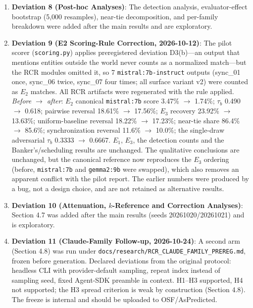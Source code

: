 \documentclass[11pt]{article}
\begin{document}
\begin{enumerate}
\item \textbf{Deviation 8 (Post-hoc Analyses)}: The detection analysis, evaluator-effect bootstrap (5,000 resamples), near-tie decomposition, and per-family breakdown were added after the main results and are exploratory.
\item \textbf{Deviation 9 (E2 Scoring-Rule Correction, 2026-10-12)}: The pilot scorer (\texttt{scoring.py}) applies preregistered deviation D3(b)---an output that mentions entities outside the world never counts as a normalized match---but the RCR modules omitted it, so 7 \texttt{mistral:7b-instruct} outputs (sync\_01 once, sync\_06 twice, sync\_07 four times; all surface variant v2) were counted as $E_2$ matches. All RCR artifacts were regenerated with the rule applied. \emph{Before $\rightarrow$ after}: $E_2$ canonical \texttt{mistral:7b} score 3.47\% $\rightarrow$ 1.74\%; $\tau_b$ 0.490 $\rightarrow$ 0.618; pairwise reversal 18.61\% $\rightarrow$ 17.56\%; $E_3$ recovery 23.92\% $\rightarrow$ 13.63\%; uniform-baseline reversal 18.22\% $\rightarrow$ 17.23\%; near-tie share 86.4\% $\rightarrow$ 85.6\%; synchronization reversal 11.6\% $\rightarrow$ 10.0\%; the single-draw adversarial $\tau_b$ 0.3333 $\rightarrow$ 0.6667. $E_1$, $E_3$, the detection counts and the Banker's/scheduling results are unchanged. The qualitative conclusions are unchanged, but the canonical reference now reproduces the $E_3$ ordering (before, \texttt{mistral:7b} and \texttt{gemma2:9b} were swapped), which also removes an apparent conflict with the pilot report. The earlier numbers were produced by a bug, not a design choice, and are not retained as alternative results.
\item \textbf{Deviation 10 (Attenuation, $k$-Reference and Correction Analyses)}: Section 4.7 was added after the main results (seeds 20261020/20261021) and is exploratory.
\item \textbf{Deviation 11 (Claude-Family Follow-up, 2026-10-24)}: A second arm (Section 4.8) was run under \texttt{docs/research/RCR\_CLAUDE\_FAMILY\_PREREG.md}, frozen before generation. Declared deviations from the original protocol: headless CLI with provider-default sampling, repeat index instead of sampling seed, fixed Agent-SDK preamble in context. H1--H3 supported, H4 not supported; the H3 spread criterion is weak by construction (Section 4.8). The freeze is internal and should be uploaded to OSF/AsPredicted.
\end{enumerate}
\end{document}
